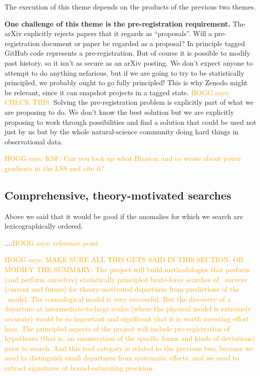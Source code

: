 \documentclass[12pt, fullpage, letterpaper]{article}
\newcommand{\HOGG}[1]{\textcolor{orange}{HOGG says: #1}}
\begin{document}
The execution of this theme depends on the products of the
previous two themes.

\textbf{One challenge of this theme is the pre-registration requirement.}
The arXiv explicitly rejects papers that it regards as ``proposals''. Will a
pre-registration document or paper be regarded as a proposal? In principle
tagged GitHub code represents a pre-registration. But of course it is possible
to modify past history, so it isn't as secure as an arXiv posting.
We don't expect anyone to attempt to do anything nefarious, but if we are
going to try to be statistically principled, we probably ought to go fully principled!
This is why Zenodo might be relevant, since it can snapshot projects in a tagged
state. \HOGG{CHECK THIS.}
Solving the pre-registration problem is explicitly part of what we are proposing to do.
We don't know the best solution but we are explicitly proposing to work through possibilities
and find a solution that could be used not just by us but by the whole natural-science
community doing hard things in observational data.

\HOGG{KSF: Can you look up what Blanton and co wrote about power gradients
in the LSS and cite it?}

\subsection{Comprehensive, theory-motivated searches}

Above we said that it would be good if the anomalies for which we search are
lexicographically ordered.

....\HOGG{reference point}

\HOGG{MAKE SURE ALL THIS GETS SAID IN THIS SECTION, OR MODIFY THE SUMMARY:
The project will build methodologies that perform (and perform
ourselves) statistically principled brute-force searches of \LSS\ 
surveys (current and future) for theory-motivated departures from
predictions of the \LCDM\ model.
The cosmological model is very successful.
But the discovery of a departure at intermediate-to-large scales
(where the physical model is extremely accurate) would be so important
and significant that it is worth investing effort here.
The principled aspects of the project will include pre-registration of
hypotheses (that is, an enumeration of the specific forms and kinds of
deviations) prior to search.
And this tool category is related to the previous two, because we need
to distinguish small departures from systematic effects, and we need
to extract signatures at bound-saturating precision.}
\end{document}
